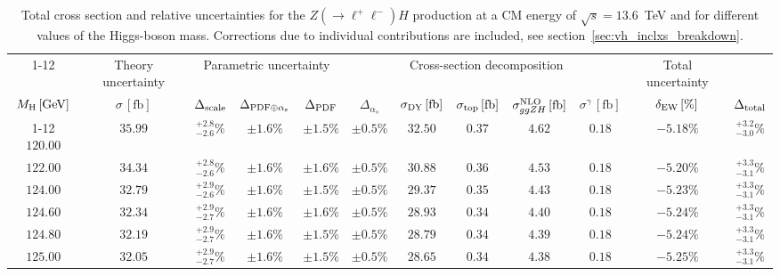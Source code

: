 \begin{landscape}
\begin{table}[ht!]
\caption{Total cross section and relative uncertainties for the $Z ( \rightarrow \ell^+ \ell^-) H$ production at a CM energy of  $\sqrt{s}=13.6$~TeV and for different values of the Higgs-boson mass. Corrections due to individual contributions are included, see section~\ref{sec:vh_inclxs_breakdown}.}
\label{tab:zh_lep_xs_13.6tev}
\centering
\scriptsize
{\renewcommand{\arraystretch}{1.4}
\begin{tabular}{| cc | c | ccc | ccccc | c |}
\cline{1-12}
\multicolumn{2}{|c|}{\(\sqrt{s} = 13.6\,\mathrm{TeV}\)} &
\multicolumn{1}{|c|}{Theory uncertainty} &
\multicolumn{3}{|c|}{Parametric uncertainty} &
\multicolumn{5}{|c|}{Cross-section decomposition} &
\multicolumn{1}{c|}{Total uncertainty} \\
\(M_\mathrm{H}\,[\mathrm{GeV}]\) & \(\sigma\,[\mathrm{fb}]\) &
\(\Delta_{\rm scale}\) &
\(\Delta_{\rm PDF\oplus\alpha_s}\) &
{\color{black!55}\(\Delta_{\rm PDF}\)} & {\color{black!55}\(\Delta_{\alpha_s}\)} &
\(\sigma_{\rm DY}\,[\mathrm{fb}]\) & \(\sigma_{\rm top}\,[\mathrm{fb}]\) & \(\sigma^{\rm NLO}_{ggZH}\,[\mathrm{fb}]\) & \(\sigma^\gamma\,[\mathrm{fb}]\) & \(\delta_{\rm EW}\,[\%]\) &
\(\Delta_{\rm total}\)
\\
\cline{1-12}
$120.00$ & $35.99$ & $^{+2.8}_{-2.6}\%$ & $\pm 1.6\%$ & {\color{black!55}$\pm 1.5\%$} & {\color{black!55}$\pm 0.5\%$} & $32.50$ & $0.37$ & $4.62$ & $0.18$ & $-5.18\%$ & $^{+3.2}_{-3.0}\%$ \\
$122.00$ & $34.34$ & $^{+2.8}_{-2.6}\%$ & $\pm 1.6\%$ & {\color{black!55}$\pm 1.6\%$} & {\color{black!55}$\pm 0.5\%$} & $30.88$ & $0.36$ & $4.53$ & $0.18$ & $-5.20\%$ & $^{+3.3}_{-3.1}\%$ \\
$124.00$ & $32.79$ & $^{+2.9}_{-2.6}\%$ & $\pm 1.6\%$ & {\color{black!55}$\pm 1.5\%$} & {\color{black!55}$\pm 0.5\%$} & $29.37$ & $0.35$ & $4.43$ & $0.18$ & $-5.23\%$ & $^{+3.3}_{-3.1}\%$ \\
$124.60$ & $32.34$ & $^{+2.9}_{-2.7}\%$ & $\pm 1.6\%$ & {\color{black!55}$\pm 1.6\%$} & {\color{black!55}$\pm 0.5\%$} & $28.93$ & $0.34$ & $4.40$ & $0.18$ & $-5.24\%$ & $^{+3.3}_{-3.1}\%$ \\
$124.80$ & $32.19$ & $^{+2.9}_{-2.7}\%$ & $\pm 1.6\%$ & {\color{black!55}$\pm 1.5\%$} & {\color{black!55}$\pm 0.5\%$} & $28.79$ & $0.34$ & $4.39$ & $0.18$ & $-5.24\%$ & $^{+3.3}_{-3.1}\%$ \\
$125.00$ & $32.05$ & $^{+2.9}_{-2.7}\%$ & $\pm 1.6\%$ & {\color{black!55}$\pm 1.5\%$} & {\color{black!55}$\pm 0.5\%$} & $28.65$ & $0.34$ & $4.38$ & $0.18$ & $-5.25\%$ & $^{+3.3}_{-3.1}\%$ \\

\end{tabular}}
\end{table}
\end{landscape}
